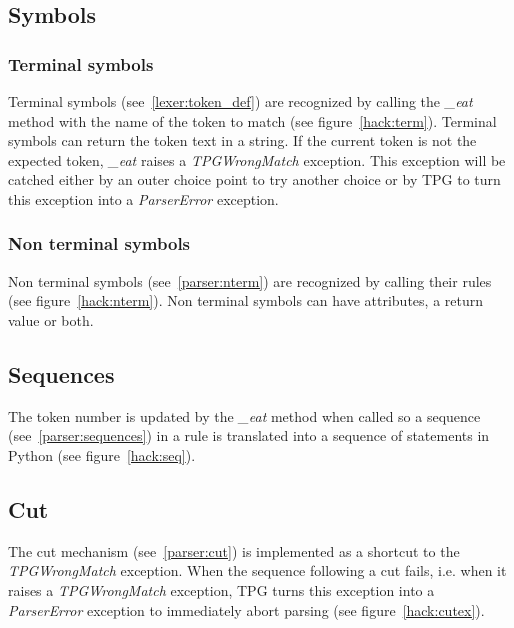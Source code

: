 
\clearpage
\subsection{Symbols}

\subsubsection{Terminal symbols}

Terminal symbols (see~\ref{lexer:token_def}) are recognized by calling the \emph{\_eat} method with the name of the token to match (see figure~\ref{hack:term}).
Terminal symbols can return the token text in a string.
If the current token is not the expected token, \emph{\_eat} raises a \emph{TPGWrongMatch} exception.
This exception will be catched either by an outer choice point to try another choice or by TPG to turn this exception into a \emph{ParserError} exception.


\subsubsection{Non terminal symbols}

Non terminal symbols (see~\ref{parser:nterm}) are recognized by calling their rules (see figure~\ref{hack:nterm}).
Non terminal symbols can have attributes, a return value or both.


\clearpage
\subsection{Sequences}										\label{hack:sequences}

The token number is updated by the \emph{\_eat} method when called so a sequence (see~\ref{parser:sequences}) in a rule is translated into a sequence of statements in Python (see figure~\ref{hack:seq}).


\clearpage
\subsection{Cut}											\label{hack:cut}

The cut mechanism (see~\ref{parser:cut}) is implemented as a shortcut to the \emph{TPGWrongMatch} exception.
When the sequence following a cut fails, i.e. when it raises a \emph{TPGWrongMatch} exception,
TPG turns this exception into a \emph{ParserError} exception to immediately abort parsing (see figure~\ref{hack:cutex}).

